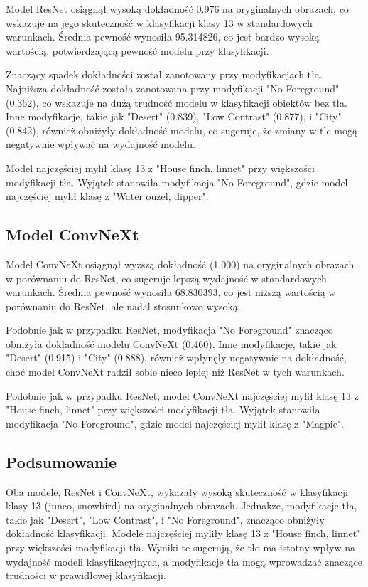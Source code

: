 Model ResNet osiągnął wysoką dokładność 0.976 na oryginalnych obrazach, co wskazuje na jego skuteczność w klasyfikacji klasy 13 w standardowych warunkach. Średnia pewność wynosiła 95.314826, co jest bardzo wysoką wartością, potwierdzającą pewność modelu przy klasyfikacji.

Znaczący spadek dokładności został zanotowany przy modyfikacjach tła. Najniższa dokładność została zanotowana przy modyfikacji "No Foreground" (0.362), co wskazuje na dużą trudność modelu w klasyfikacji obiektów bez tła. Inne modyfikacje, takie jak "Desert" (0.839), "Low Contrast" (0.877), i "City" (0.842), również obniżyły dokładność modelu, co sugeruje, że zmiany w tle mogą negatywnie wpływać na wydajność modelu.

Model najczęściej mylił klasę 13 z "House finch, linnet" przy większości modyfikacji tła. Wyjątek stanowiła modyfikacja "No Foreground", gdzie model najczęściej mylił klasę z "Water ouzel, dipper".

\subsection*{Model ConvNeXt}

Model ConvNeXt osiągnął wyższą dokładność (1.000) na oryginalnych obrazach w porównaniu do ResNet, co sugeruje lepszą wydajność w standardowych warunkach. Średnia pewność wynosiła 68.830393, co jest niższą wartością w porównaniu do ResNet, ale nadal stosunkowo wysoką.

Podobnie jak w przypadku ResNet, modyfikacja "No Foreground" znacząco obniżyła dokładność modelu ConvNeXt (0.460). Inne modyfikacje, takie jak "Desert" (0.915) i "City" (0.888), również wpłynęły negatywnie na dokładność, choć model ConvNeXt radził sobie nieco lepiej niż ResNet w tych warunkach.

Podobnie jak w przypadku ResNet, model ConvNeXt najczęściej mylił klasę 13 z "House finch, linnet" przy większości modyfikacji tła. Wyjątek stanowiła modyfikacja "No Foreground", gdzie model najczęściej mylił klasę z "Magpie".

\subsection*{Podsumowanie}

Oba modele, ResNet i ConvNeXt, wykazały wysoką skuteczność w klasyfikacji klasy 13 (junco, snowbird) na oryginalnych obrazach. Jednakże, modyfikacje tła, takie jak "Desert", "Low Contrast", i "No Foreground", znacząco obniżyły dokładność klasyfikacji. Modele najczęściej myliły klasę 13 z "House finch, linnet" przy większości modyfikacji tła. Wyniki te sugerują, że tło ma istotny wpływ na wydajność modeli klasyfikacyjnych, a modyfikacje tła mogą wprowadzać znaczące trudności w prawidłowej klasyfikacji.


